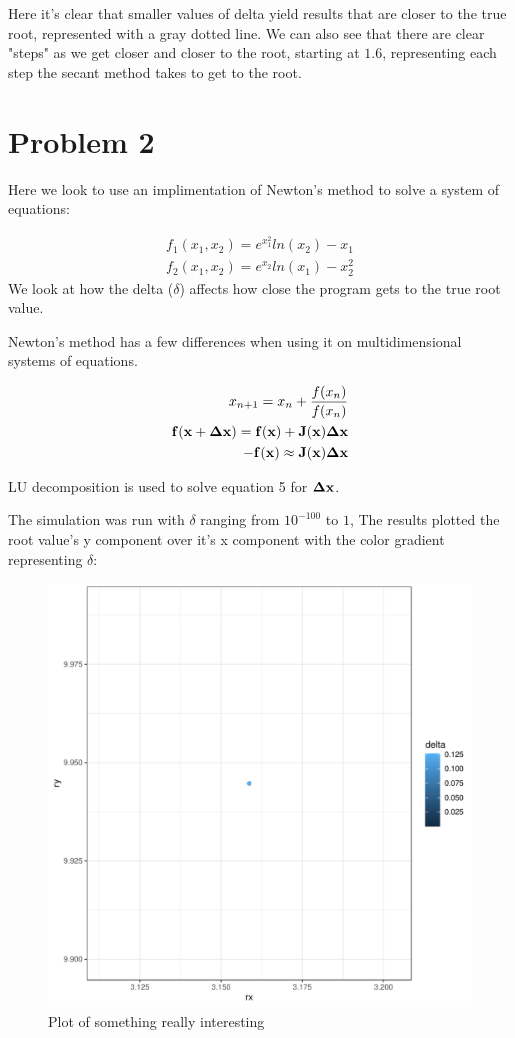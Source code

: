 \documentclass[prb,twocolumn]{revtex4-2}
\begin{document}
Here it's clear that smaller values of delta yield results that are closer to the true root, represented with a gray dotted line. We can also see that there are clear "steps" as we get closer and closer to the root, starting at $1.6$, representing each step the secant method takes to get to the root.

\section{Problem 2}

Here we look to use an implimentation of Newton's method to solve a system of equations:

\begin{eqnarray}
f_1(x_1,x_2)=e^{x_1^2}ln(x_2)-x_1 \\
f_2(x_1,x_2)=e^{x_2}ln(x_1)-x_2^2
\label{namefornewequation}
\end{eqnarray}
We look at how the delta ($\delta$) affects how close the program gets to the true root value.

Newton's method has a few differences when using it on multidimensional systems of equations.

\begin{eqnarray}
x_{n+1}=x_n+\frac{f(x_n)}{f(x_n)} \\
\bold{f(x+\Delta x)}=\bold{f(x)}+\bold{J(x)\Delta x} \\
-\bold{f(x)}\approx\bold{J(x)\Delta x}
\label{namefornewequation}
\end{eqnarray}

LU decomposition is used to solve equation 5 for $\bold{\Delta x}$.


The simulation was run with $\delta$ ranging from $10^{-100}$ to $1$, The results plotted the root value's y component over it's x component with the color gradient representing $\delta$:

\begin{figure}[h!]
\centerline{\includegraphics [width=3 in] {newton}} \caption{Plot of something really interesting} \label{nameforfigure2}
\end{figure}
\end{document}
